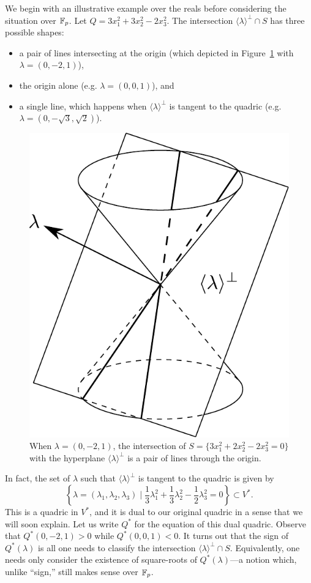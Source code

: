 We begin with an illustrative example over the reals before considering the situation over $\mathbb{F}_p$. Let $Q = 3x_1^2 + 3x_2^2 - 2x_3^2$.
The intersection $\langle \lambda \rangle^\bot \cap S$ has three possible shapes:
\begin{itemize}
	\item a pair of lines intersecting at the origin (which depicted in Figure~\ref{fig:conic-with-plane} with $\lambda = (0,-2,1)$),
	\item the origin alone (e.g. $\lambda = (0,0,1)$), and
	\item a single line, which happens when $\langle \lambda \rangle^\bot$ is tangent to the quadric (e.g. $\lambda = (0,-\sqrt{3},\sqrt{2})$).
\end{itemize}
\begin{figure}[h]
	\centering
	\includegraphics[width=0.6\linewidth]{conic-with-plane}
	\caption{When $\lambda=(0,-2,1)$, the intersection of $S = \{3x_1^2 + 2x_2^2 - 2x_3^2 = 0\}$ with the hyperplane $\langle \lambda \rangle^\bot$ is a pair of lines through the origin.}
	\label{fig:conic-with-plane}
\end{figure}
In fact, the set of $\lambda$ such that $\langle \lambda \rangle^\bot$ is tangent to the quadric is given by
\[
	\left\{ \lambda = (\lambda_1,\lambda_2,\lambda_3) \mid \frac{1}{3} \lambda_1^2 + \frac{1}{3} \lambda_2^2 - \frac{1}{2} \lambda_3^2 = 0 \right\} \subset V^*.
\]
This is a quadric in $V^*$, and it is dual to our original quadric in a sense that we will soon explain. Let us write $Q^*$ for the equation of this dual quadric. Observe that $Q^*(0,-2,1) > 0$ while $Q^*(0,0,1) < 0$. It turns out that the sign of $Q^*(\lambda)$ is all one needs to classify the intersection $\langle \lambda \rangle^\bot \cap S$. Equivalently, one needs only consider the existence of square-roots of $Q^*(\lambda)$---a notion which, unlike ``sign,'' still makes sense over $\mathbb{F}_p$.

